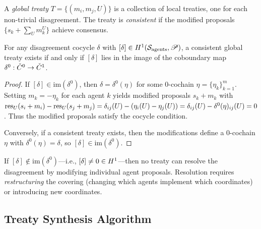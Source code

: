 \documentclass[11pt]{article}
\newcommand{\ProposalSheaf}{\mathscr{P}}
\newcommand{\AgentSite}{\mathcal{S}_{\mathrm{agents}}}
\begin{document}
\begin{definition}\label{def:global-treaty}
A \emph{global treaty} $T = \{(m_i, m_j, U)\}$ is a collection of
local treaties, one for each non-trivial disagreement.  The treaty is
\emph{consistent} if the modified proposals
$\{s_k + \sum_{U} m_k^U\}$ achieve consensus.
\end{definition}

\begin{theorem}\label{thm:treaty-existence}
For any disagreement cocycle $\delta$ with
$[\delta] \in \Hcoh{1}(\AgentSite, \ProposalSheaf)$, a consistent
global treaty exists if and only if $[\delta]$ lies in the image of
the coboundary map $\delta^0 : \check{C}^0 \to \check{C}^1$.
\end{theorem}

\begin{proof}
If $[\delta] \in \mathrm{im}(\delta^0)$, then $\delta = \delta^0(\eta)$
for some 0-cochain $\eta = \{\eta_k\}_{k=1}^m$.  Setting
$m_k = -\eta_k$ for each agent $k$ yields modified proposals
$s_k + m_k$ with $\mathrm{res}_U(s_i + m_i) - \mathrm{res}_U(s_j + m_j) =
\delta_{ij}(U) - (\eta_i(U) - \eta_j(U)) = \delta_{ij}(U) -
\delta^0(\eta)_{ij}(U) = 0$.  Thus the modified proposals satisfy
the cocycle condition.

Conversely, if a consistent treaty exists, then the modifications
define a 0-cochain $\eta$ with $\delta^0(\eta) = \delta$, so
$[\delta] \in \mathrm{im}(\delta^0)$.
\end{proof}

\begin{corollary}\label{cor:irreconcilable}
If $[\delta] \notin \mathrm{im}(\delta^0)$---i.e.,
$[\delta] \neq 0 \in H^{1}$---then no treaty can resolve the
disagreement by modifying individual agent proposals.  Resolution
requires \emph{restructuring} the covering (changing which agents
implement which coordinates) or introducing new coordinates.
\end{corollary}

\subsection{Treaty Synthesis Algorithm}\label{subsec:treaty-alg}
\end{document}
